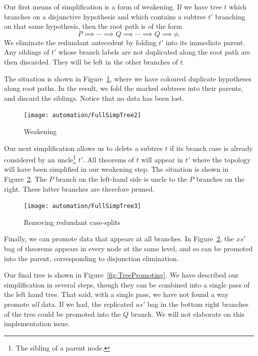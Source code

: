 Our first means of simplification is a form of weakening. If we have tree $t$ which branches on a disjunctive hypothesis and which contains a subtree $t'$ branching on that same hypothesis, then the root path is of the form 
\begin{displaymath}
P \implies \cdots \implies Q \implies \cdots \implies Q \implies \phi.
\end{displaymath}
We eliminate the redundant antecedent by folding $t'$ into its immediate parent. Any siblings of $t'$ whose branch labels are not duplicated along the root path are then discarded. They will be left in the other branches of $t$.

The situation is shown in Figure~\ref{fig:TreeWeakening}, where we have coloured duplicate hypotheses along root paths. In the result, we fold the marked subtrees into their parents, and discard the siblings. Notice that no data has been lost.

\begin{figure}
\centering\texttt{[image: automation/FullSimpTree2]}
\caption{Weakening}
\label{fig:TreeWeakening}
\end{figure}

Our next simplification allows us to delete a subtree $t$ if its branch case is already considered by an uncle\footnote{The sibling of a parent node.} $t'$. All theorems of $t$ will appear in $t'$ where the topology will have been simplified in our weakening step. The situation is shown in Figure~\ref{fig:TreeRedundantSplits}. The $P$ branch on the left-hand side is uncle to the $P$ branches on the right. These latter branches are therefore pruned.

\begin{figure}
\centering\texttt{[image: automation/FullSimpTree3]}
\caption{Removing redundant case-splits}
\label{fig:TreeRedundantSplits}
\end{figure}

Finally, we can promote data that appears at all branches. In Figure~\ref{fig:TreeRedundantSplits}, the $xs'$ bag of theorems appears in every node at the same level, and so can be promoted into the parent, corresponding to disjunction elimination. 

Our final tree is shown in Figure~\ref{fig:TreePromoting}. We have described our simplification in several steps, though they can be combined into a single pass of the left hand tree. That said, with a single pass, we have not found a way promote \emph{all} data. If we had, the replicated $us'$ bag in the bottom right branches of the tree could be promoted into the $Q$ branch. We will not elaborate on this implementation issue.

